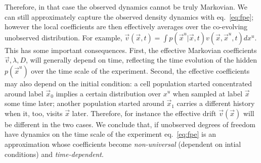 Therefore, in that case the observed dynamics cannot be truly
Markovian. We can still approximately capture the observed density dynamics
with eq.~\ref{eq:fpe}; however the local coefficients are then effectively
averages over the co-evolving unobserved distribution. For example, $\vec
v(\vec x,t)=\int p(\vec x^u|\vec x,t)v(\vec x,\vec x^u,t)dx^u$. This has some
important consequences. First, the effective Markovian coefficients $\vec v,
\lambda, D$, will generally depend on time, reflecting the time evolution of
the hidden $p(\vec x^u)$ over the time scale of the experiment. Second, the
effective coefficients may also depend on the initial condition: a cell
population started concentrated around label $\vec x_0$ implies a certain
distribution over $x^u$ when sampled at label $\vec x$ some time later; another
population started around $\vec x_1$ carries a different history when it, too,
visits $\vec x$ later. Therefore, for instance the effective drift $\vec v(\vec
x)$ will be different in the two cases. We conclude that, if unobserved degrees
of freedom have dynamics on the time scale of the experiment eq.~\ref{eq:fpe}
is an approximation whose coefficients become \emph{non-universal} (dependent
on intial conditions) and \emph{time-dependent}.
